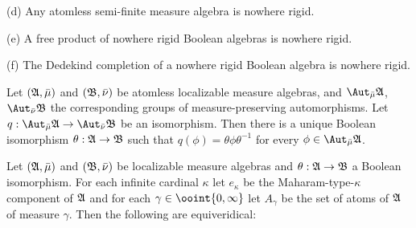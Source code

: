 (d) Any atomless semi-finite measure algebra is nowhere rigid.
     
(e) A free product of nowhere rigid Boolean algebras is nowhere rigid.
     
(f) The Dedekind completion of a nowhere rigid Boolean algebra is
nowhere rigid.
     
     
Let $(\frak A,\bar\mu)$ and $(\frak B,\bar\nu)$ be atomless
localizable measure algebras, and $\Aut_{\bar\mu}\frak A$,
$\Aut_{\bar\nu}\frak B$ the corresponding groups of measure-preserving 
automorphisms.
Let $q:\Aut_{\bar\mu}\frak A\to\Aut_{\bar\nu}\frak B$ be an isomorphism.
Then there is a unique Boolean isomorphism $\theta:\frak A\to\frak B$ such that $q(\phi)=\theta\phi\theta^{-1}$ for every
$\phi\in\Aut_{\bar\mu}\frak A$.
     
     
 Let $(\frak A,\bar\mu)$ and
$(\frak B,\bar\nu)$ be
localizable measure algebras and $\theta:\frak A\to\frak B$ a Boolean
isomorphism.   For each infinite cardinal $\kappa$ let $e_{\kappa}$ be
the Maharam-type-$\kappa$ component of $\frak A$ and
for each $\gamma\in\ooint{0,\infty}$ let $A_{\gamma}$ be the set of atoms 
of $\frak A$ of measure $\gamma$.   Then the following are equiveridical:
     
